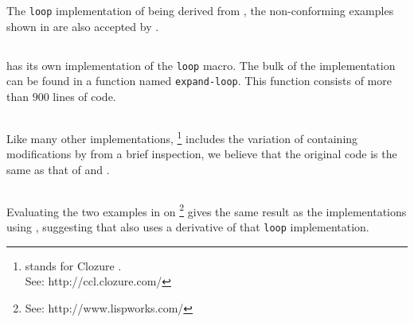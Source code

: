 The \texttt{loop} implementation of \sbcl{} being derived from
\mitloop{}, the non-conforming examples shown in 
are also accepted by \sbcl{}.

\subsection{\clisp{}}

\clisp{} has its own implementation of the \texttt{loop} macro.  The
bulk of the implementation can be found in a function named
\texttt{expand-loop}.  This function consists of more than $900$ lines
of code.

\subsection{\ccl{}}

Like many other implementations, \ccl{}%
\footnote{\ccl{} stands for Clozure \commonlisp.\\ See:
  http://ccl.clozure.com/} includes the variation of \mitloop{}
containing modifications by \symbolics{} from a brief inspection, we
believe that the original code is the same as that of \sbcl{} and
\ecl{}.

\subsection{\lispworks}

Evaluating the two examples in  on \lispworks{}%
\footnote{See: http://www.lispworks.com/}
gives the same result as the implementations using \mitloop{},
suggesting that \lispworks{} also uses a derivative of that
\texttt{loop} implementation.
